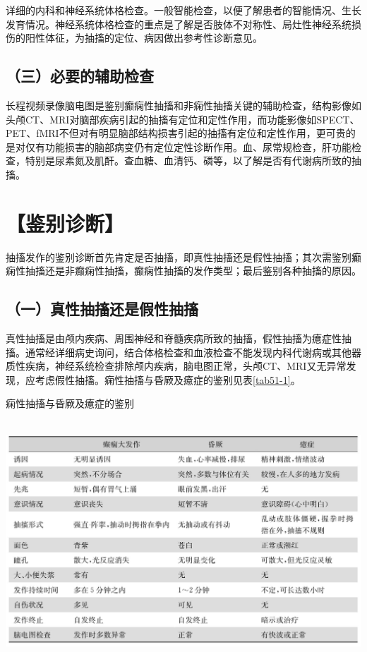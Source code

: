 详细的内科和神经系统体格检查。一般智能检查，以便了解患者的智能情况、生长发育情况。神经系统体格检查的重点是了解是否肢体不对称性、局灶性神经系统损伤的阳性体征，为抽搐的定位、病因做出参考性诊断意见。

\subsection{（三）必要的辅助检查}

长程视频录像脑电图是鉴别癫痫性抽搐和非痫性抽搐关键的辅助检查，结构影像如头颅CT、MRI对脑部疾病引起的抽搐有定位和定性作用，而功能影像如SPECT、PET、fMRI不但对有明显脑部结构损害引起的抽搐有定位和定性作用，更可贵的是对仅有功能损害的脑部病变仍有定位定性诊断作用。血、尿常规检查，肝功能检查，特别是尿素氮及肌酐。查血糖、血清钙、磷等，以了解是否有代谢病所致的抽搐。

\section{【鉴别诊断】}

抽搐发作的鉴别诊断首先肯定是否抽搐，即真性抽搐还是假性抽搐；其次需鉴别癫痫性抽搐还是非癫痫性抽搐，癫痫性抽搐的发作类型；最后鉴别各种抽搐的原因。

\subsection{（一）真性抽搐还是假性抽搐}

真性抽搐是由颅内疾病、周围神经和脊髓疾病所致的抽搐，假性抽搐为癔症性抽搐。通常经详细病史询问，结合体格检查和血液检查不能发现内科代谢病或其他器质性疾病，神经系统检查排除颅内疾病，脑电图正常，头颅CT、MRI又无异常发现，应考虑假性抽搐。痫性抽搐与昏厥及癔症的鉴别见表\ref{tab51-1}。

\begin{table}[htbp]
\centering
\caption{痫性抽搐与昏厥及癔症的鉴别}
\label{tab51-1}
\includegraphics[width=5.9375in,height=3.54167in]{./images/Image00312.jpg}
\end{table}


